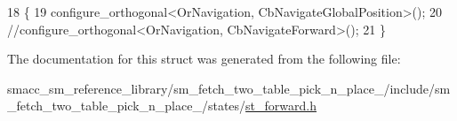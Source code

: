 \begin{DoxyCode}
18   \{
19      configure\_orthogonal<OrNavigation, CbNavigateGlobalPosition>();
20     \textcolor{comment}{//configure\_orthogonal<OrNavigation, CbNavigateForward>();}
21   \}
\end{DoxyCode}


The documentation for this struct was generated from the following file\+:\begin{DoxyCompactItemize}
\item 
smacc\+\_\+sm\+\_\+reference\+\_\+library/sm\+\_\+fetch\+\_\+two\+\_\+table\+\_\+pick\+\_\+n\+\_\+place\+\_/include/sm\+\_\+fetch\+\_\+two\+\_\+table\+\_\+pick\+\_\+n\+\_\+place\+\_/states/\hyperlink{st__forward_8h}{st\+\_\+forward.\+h}\end{DoxyCompactItemize}
